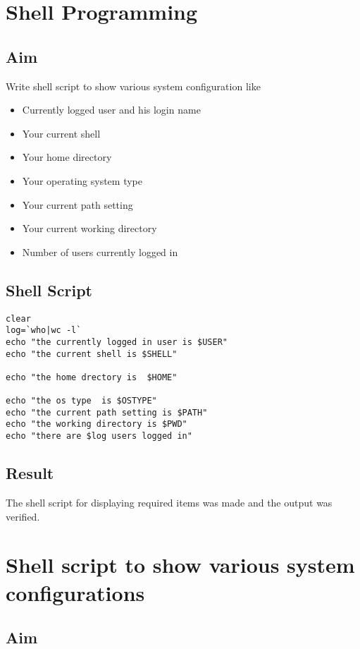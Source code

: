\documentclass{article}
\begin{document}
\newpage

\section{Shell Programming}
\subsection{Aim}
Write shell script to show various system configuration like
\begin{itemize}
\item Currently logged user and his login name
\item Your current shell
\item Your home directory
\item Your operating system type
\item Your current path setting
\item Your current working directory
\item Number of users currently logged in
\end{itemize}

\subsection{Shell Script}
\begin{verbatim}
clear
log=`who|wc -l`
echo "the currently logged in user is $USER"
echo "the current shell is $SHELL"

echo "the home drectory is  $HOME"

echo "the os type  is $OSTYPE"
echo "the current path setting is $PATH"
echo "the working directory is $PWD"
echo "there are $log users logged in"
\end{verbatim}

\subsection{Result}
The shell script for displaying required items was made and the output was verified.

\newpage

\section{Shell script to show various system configurations}

\subsection {Aim}
\end{document}
